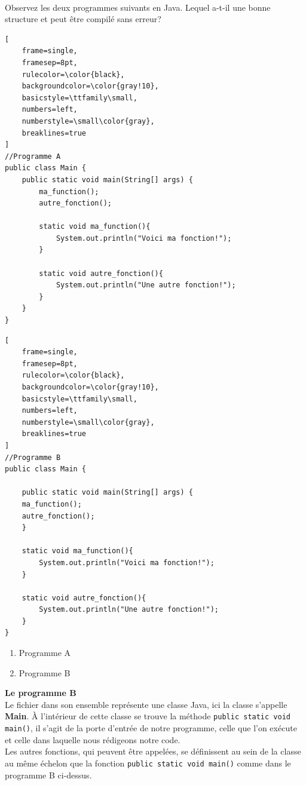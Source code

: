 \begin{Exercice}[3 minutes] \\
Observez les deux programmes suivants en Java. Lequel a-t-il une bonne structure et peut être compilé sans erreur?

\begin{lstlisting}[
    frame=single,
    framesep=8pt,
    rulecolor=\color{black},
    backgroundcolor=\color{gray!10},
    basicstyle=\ttfamily\small,
    numbers=left,
    numberstyle=\small\color{gray},
    breaklines=true
]
//Programme A
public class Main {
    public static void main(String[] args) {
        ma_function();
        autre_fonction();

        static void ma_function(){
            System.out.println("Voici ma fonction!");
        }
    
        static void autre_fonction(){
            System.out.println("Une autre fonction!");
        }
    }
}
\end{lstlisting}

\begin{lstlisting}[
    frame=single,
    framesep=8pt,
    rulecolor=\color{black},
    backgroundcolor=\color{gray!10},
    basicstyle=\ttfamily\small,
    numbers=left,
    numberstyle=\small\color{gray},
    breaklines=true
]
//Programme B
public class Main {

    public static void main(String[] args) {
    ma_function();
    autre_fonction();
    }

    static void ma_function(){
        System.out.println("Voici ma fonction!");
    }

    static void autre_fonction(){
        System.out.println("Une autre fonction!");
    }
}
\end{lstlisting}

\begin{enumerate}
    \item Programme A
    \item Programme B
\end{enumerate}
\begin{solution}
    \textbf{Le programme B}\\
    Le fichier dans son ensemble représente une classe Java, ici la classe s'appelle \textbf{Main}. À l'intérieur de cette classe se trouve la méthode \lstinline{public static void main()}, il s'agit de la porte d'entrée de notre programme, celle que l'on exécute et celle dans laquelle nous rédigeons notre code.\\
    Les autres fonctions, qui peuvent être appelées, se définissent au sein de la classe au même échelon que la fonction \lstinline{public static void main()} comme dans le programme B ci-dessus. 
\end{solution}
\end{Exercice}

